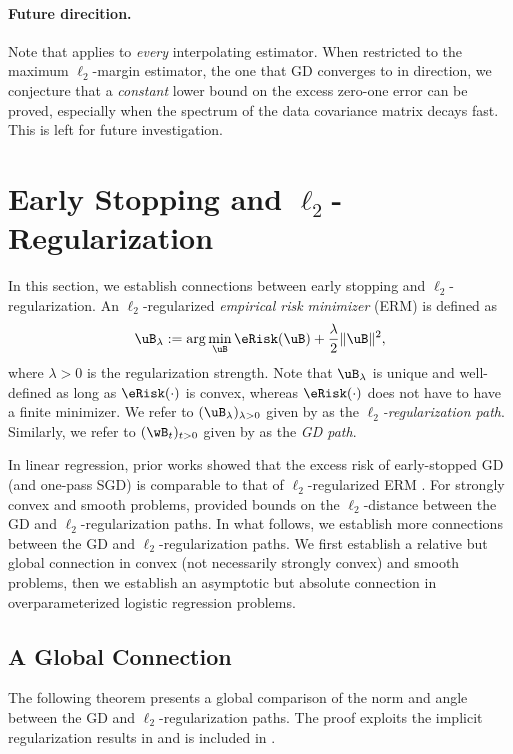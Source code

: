 \documentclass[11pt]{article}
\begin{document}
\paragraph{Future direcition.}
Note that  applies to \emph{every} interpolating estimator. When restricted to the maximum $\ell_2$-margin estimator, the one that GD converges to in direction, we conjecture that a \emph{constant} lower bound on the excess zero-one error can be proved, especially when the spectrum of the data covariance matrix decays fast. This is left for future investigation. 


\section{Early Stopping and \texorpdfstring{$\ell_2$}{l2}-Regularization}\label{sec:l2-regularization}
In this section, we establish connections between early stopping and $\ell_2$-regularization.
An $\ell_2$-regularized \emph{empirical risk minimizer} (ERM) is defined as
\begin{equation}\label{eq:l2-regularization}
    \uB_{\lambda} := \arg\min_{\uB} \eRisk(\uB) + \frac{\lambda}{2} \|\uB\|^2,
\end{equation}
where $\lambda>0$ is the regularization strength. Note that $\uB_{\lambda}$ is unique and well-defined as long as $\eRisk(\cdot)$ is convex, whereas $\eRisk(\cdot)$ does not have to have a finite minimizer. We refer to $(\uB_{\lambda})_{\lambda>0}$ 
given by  
as the \emph{$\ell_2$-regularization path}. Similarly, we refer to $(\wB_t)_{t> 0}$ given by  as the \emph{GD path}.

In linear regression, prior works showed that the excess risk of early-stopped GD (and one-pass SGD) is comparable to that of $\ell_2$-regularized ERM \citep{ali2019continuous,zou2021benefits}. 
For strongly convex and smooth problems, \citet{suggala2018connecting} provided bounds on the $\ell_2$-distance between the GD and $\ell_2$-regularization paths. 
In what follows, we establish more connections between the GD and $\ell_2$-regularization paths. We first establish a relative but global connection in convex (not necessarily strongly convex) and smooth problems, then we establish an asymptotic but absolute connection in overparameterized logistic regression problems.


\subsection{A Global Connection}
The following theorem presents a global comparison of the norm and angle between the GD and $\ell_2$-regularization paths. The proof exploits the implicit regularization results in  and is included in .
\end{document}
